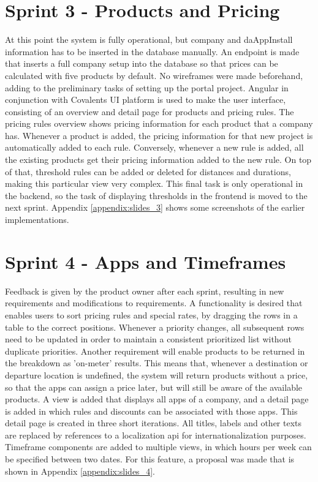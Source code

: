 \section{Sprint 3 - Products and Pricing}
At this point the system is fully operational, but company and daAppInstall information has to be inserted in the database manually. An endpoint is made that inserts a full company setup into the database so that prices can be calculated with five products by default. No wireframes were made beforehand, adding to the preliminary tasks of setting up the portal project. Angular in conjunction with Covalents UI platform is used to make the user interface, consisting of an overview and detail page for products and pricing rules. The pricing rules overview shows pricing information for each product that a company has. Whenever a product is added, the pricing information for that new project is automatically added to each rule. Conversely, whenever a new rule is added, all the existing products get their pricing information added to the new rule. On top of that, threshold rules can be added or deleted for distances and durations, making this particular view very complex. This final task is only operational in the backend, so the task of displaying thresholds in the frontend is moved to the next sprint. Appendix \ref{appendix:slides_3} shows some screenshots of the earlier implementations.

%
\section{Sprint 4 - Apps and Timeframes}
Feedback is given by the product owner after each sprint, resulting in new requirements and modifications to requirements. A functionality is desired that enables users to sort pricing rules and special rates, by dragging the rows in a table to the correct positions. Whenever a priority changes, all subsequent rows need to be updated in order to maintain a consistent prioritized list without duplicate priorities. Another requirement will enable products to be returned in the breakdown as 'on-meter' results. This means that, whenever a destination or departure location is undefined, the system will return products without a price, so that the apps can assign a price later, but will still be aware of the available products. A view is added that displays all apps of a company, and a detail page is added in which rules and discounts can be associated with those apps. This detail page is created in three short iterations. All titles, labels and other texts are replaced by references to a localization api for internationalization purposes. Timeframe components are added to multiple views, in which hours per week can be specified between two dates. For this feature, a proposal was made that is shown in Appendix \ref{appendix:slides_4}.


